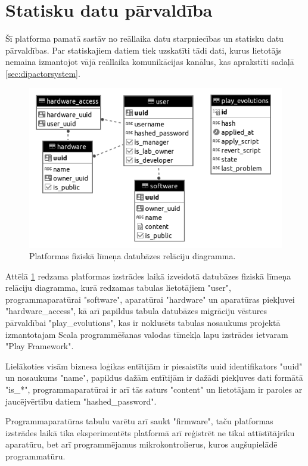 \section{Statisku datu pārvaldība}
\label{sec:staticdata}

Šī platforma pamatā sastāv no reāllaika datu starpniecības un statisku datu
pārvaldības. Par statiskajiem datiem tiek uzskatīti tādi dati, kurus lietotājs
nemaina izmantojot vājā reāllaika komunikācijas kanālus, kas aprakstīti sadaļā
\ref{sec:dipactorsystem}. 

\begin{figure}[H]
    \includegraphics[width=0.7\linewidth]{assets/physical-er-diagram-gray.png}
    \centering
    \caption{Platformas fiziskā līmeņa datubāzes relāciju diagramma.}
    \label{fig:staticdata}
\end{figure}

Attēlā \ref{fig:staticdata} redzama platformas izstrādes laikā izveidotā
datubāzes fiziskā līmeņa relāciju diagramma, kurā redzamas tabulas lietotājiem
"user", programmaparatūrai "software", aparatūrai "hardware" un aparatūras
piekļuvei "hardware\_access", kā arī papildus tabula datubāzes migrāciju
vēstures pārvaldībai "play\_evolutions", kas ir noklusēts tabulas nosaukums
projektā izmantotajam Scala programmēšanas valodas tīmekļa lapu izstrādes
ietvaram "Play Framework".

Lielākoties visām biznesa loģikas entītijām ir piesaistīts \gls{uuid}
identifikators "uuid" un nosaukums "name", papildus dažām entītijām ir dažādi
piekļuves dati formātā "is\_*", programmaparatūrai ir arī tās saturs "content"
un lietotājam ir paroles ar jaucējvērtību datiem "hashed\_password".

Programmaparatūras tabulu varētu arī saukt "firmware", taču platformas izstrādes
laikā tika eksperimentēts platformā arī reģistrēt ne tikai attīstītājrīku
aparatūru, bet arī programmējamus mikrokontrolierus, kuros augšupielādē
programmatūru.

